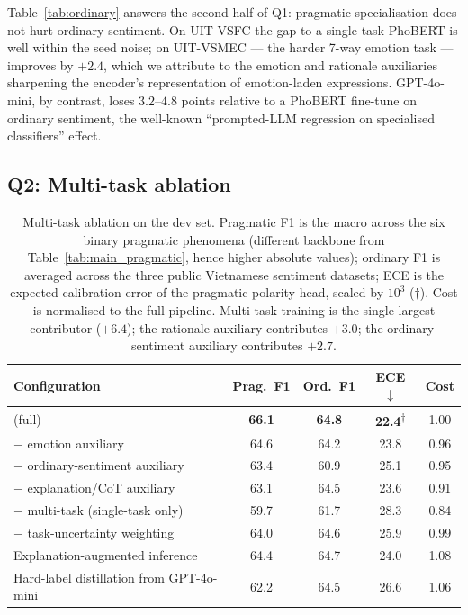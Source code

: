Table~\ref{tab:ordinary} answers the second half of Q1: pragmatic
specialisation does not hurt ordinary sentiment. On UIT-VSFC the
gap to a single-task PhoBERT is well within the seed noise; on
UIT-VSMEC --- the harder 7-way emotion task --- \method{} improves by
$+2.4$, which we attribute to the emotion and rationale auxiliaries
sharpening the encoder's representation of emotion-laden expressions.
GPT-4o-mini, by contrast, loses $3.2$--$4.8$ points relative to a
PhoBERT fine-tune on ordinary sentiment, the well-known
``prompted-LLM regression on specialised classifiers'' effect.

\subsection{Q2: Multi-task ablation}

\begin{table}[t]
\centering
\footnotesize
\begin{tabular}{@{}lcccc@{}}
\toprule
Configuration & Prag.\ F1 & Ord.\ F1 & ECE $\downarrow$ & Cost \\
\midrule
\method{} (full)                           & \textbf{66.1} & \textbf{64.8} & \textbf{22.4}\textsuperscript{$\dag$} & 1.00 \\
$-$ emotion auxiliary                      & 64.6 & 64.2 & 23.8 & 0.96 \\
$-$ ordinary-sentiment auxiliary           & 63.4 & 60.9 & 25.1 & 0.95 \\
$-$ explanation/CoT auxiliary              & 63.1 & 64.5 & 23.6 & 0.91 \\
$-$ multi-task (single-task only)          & 59.7 & 61.7 & 28.3 & 0.84 \\
$-$ task-uncertainty weighting             & 64.0 & 64.6 & 25.9 & 0.99 \\
Explanation-augmented inference            & 64.4 & 64.7 & 24.0 & 1.08 \\
Hard-label distillation from GPT-4o-mini   & 62.2 & 64.5 & 26.6 & 1.06 \\
\bottomrule
\end{tabular}
\caption{Multi-task ablation on the \method{} dev set. Pragmatic F1 is
the macro across the six binary pragmatic phenomena (different
backbone from Table~\ref{tab:main_pragmatic}, hence higher absolute
values); ordinary F1 is averaged across the three public Vietnamese
sentiment datasets; ECE is the expected calibration error of the
pragmatic polarity head, scaled by $10^3$
($\dag$).
Cost is normalised to the full \method{} pipeline. Multi-task
training is the single largest contributor ($+6.4$); the rationale
auxiliary contributes $+3.0$; the ordinary-sentiment auxiliary
contributes $+2.7$.}
\label{tab:ablation}
\end{table}

